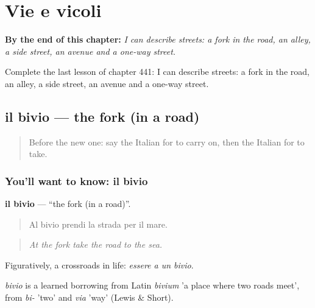 
\chapter{Vie e vicoli}
\label{ch:it-vie-e-vicoli}

\begin{chapteropening}
\textbf{By the end of this chapter:} \emph{I can describe streets: a fork in the road, an alley, a side street, an avenue and a one-way street.}

Complete the last lesson of chapter 441: I can describe streets: a fork in the road, an alley, a side street, an avenue and a one-way street.
\end{chapteropening}

\section[il bivio]{il bivio — the fork (in a road)}

\label{lesson:IT-C441-bivio}



\begin{quote}
Before the new one: say the Italian for to carry on, then the Italian for to take.
\end{quote}

\subsection*{You'll want to know: il bivio}
\textbf{il bivio} — \textquotedblleft{}the fork (in a road)\textquotedblright{}.

\begin{quote}
Al bivio prendi la strada per il mare.
\end{quote}

\begin{quote}
\emph{At the fork take the road to the sea.}
\end{quote}

Figuratively, a crossroads in life: \emph{essere a un bivio}.

\begin{cousinweb}
\emph{bivio} is a learned borrowing from Latin \emph{bivium} 'a place where two roads meet', from \emph{bi-} 'two' and \emph{via} 'way' (Lewis \& Short).
\end{cousinweb}

